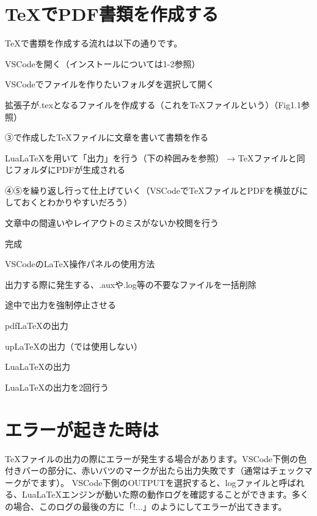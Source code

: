 \begin{multicols*}{2}
\section{\TeX でPDF書類を作成する}
\TeX で書類を作成する流れは以下の通りです。
\begin{enumcircle}
    \item VSCodeを開く（インストールについては1-2参照）
    \item VSCodeでファイルを作りたいフォルダを選択して開く
    \item 拡張子が.texとなるファイルを作成する（これを\TeX ファイルという）（Fig1.1参照）
    \item ③で作成した\TeX ファイルに文章を書いて書類を作る
    \item Lua\LaTeX を用いて「出力」を行う（下の枠囲みを参照） → \TeX ファイルと同じフォルダにPDFが生成される
    \item ④⑤を繰り返し行って仕上げていく（VSCodeで\TeX ファイルとPDFを横並びにしておくとわかりやすいだろう）
    \item 文章中の間違いやレイアウトのミスがないか校閲を行う
    \item 完成
\end{enumcircle}
\begin{framebox-simple}{VSCodeの\LaTeX 操作パネルの使用方法}
\begin{enumbrackets}
    \item 出力する際に発生する、.auxや.log等の不要なファイルを一括削除
    \item 途中で出力を強制停止させる
    \item pdf\LaTeX の出力
    \item up\LaTeX の出力（\BunTeX では使用しない）
    \item Lua\LaTeX の出力
    \item Lua\LaTeX の出力を2回行う
\end{enumbrackets}
\end{framebox-simple}


\section{エラーが起きた時は}%
\TeX ファイルの出力の際にエラーが発生する場合があります。VSCode下側の色付きバーの部分に、赤いバツのマークが出たら出力失敗です（通常はチェックマークがでます）。
VSCode下側のOUTPUTを選択すると、logファイルと呼ばれる、Lua\LaTeX エンジンが動いた際の動作ログを確認することができます。多くの場合、このログの最後の方に「!...」のようにしてエラーが出てきます。


\end{multicols*}
